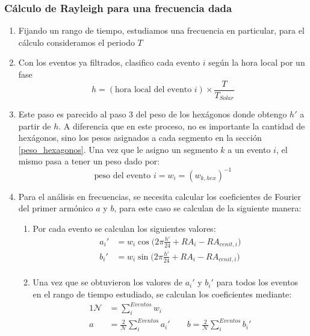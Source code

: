   \subsubsection{Cálculo de Rayleigh para una frecuencia dada}

            \begin{enumerate}
        \item Fijando un rango de tiempo, estudiamos una frecuencia en particular, para el cálculo consideramos el periodo $T$
        \item Con los eventos ya filtrados, clasifico cada evento $i$ según la hora local por un fase
        \begin{equation*}
          h = (\text{hora local del evento } i)\times \frac{T}{T_{Solar}}
        \end{equation*}
        \item Este paso es parecido al paso $3$ del peso de los hexágonos donde obtengo $h'$ a partir de $h$. A diferencia que en este proceso, no es importante la cantidad de hexágonos, sino los pesos asignados a cada segmento en  la sección \ref{peso_hexagonos}. Una vez que le asigno un segmento $k$ a un evento $i$, el mismo pasa a tener un peso dado por:
        \begin{equation*}
          \text{peso del evento } i = w_{i}= (w_{k, hex})^{-1}
          \end{equation*} 
         
        \item Para el análisis en frecuencias, se necesita calcular los coeficientes de Fourier del primer armónico $a$ y $b$, para este caso se calculan de la siguiente manera:

        \begin{enumerate}
          \item Por cada evento se calculan los siguientes valores:
          \begin{align}
             a_i' &= {w_i}\cos\Big(2\pi \frac{h'}{24} + RA_i -RA_{cenit,i}\Big)\\
             b_i' &= {w_i}\sin\Big(2\pi \frac{h'}{24} + RA_i -RA_{cenit,i}\Big)\\
         \end{align}
         
         \item Una vez que se obtuvieron los valores de $a_i'$ y $b_i'$ para todos los eventos en el rango de tiempo estudiado, se calculan los coeficientes mediante:
         \begin{alignat}{1}
          \mathcal{N} &= \sum^{Eventos}_i w_i\\ 
            a &= \frac{2}{\mathcal{N}} \sum^{Eventos}_i a_i' \qquad
            b = \frac{2}{\mathcal{N}} \sum^{Eventos}_i b_i'  
         \end{alignat}
        \end{enumerate}


\end{enumerate}
